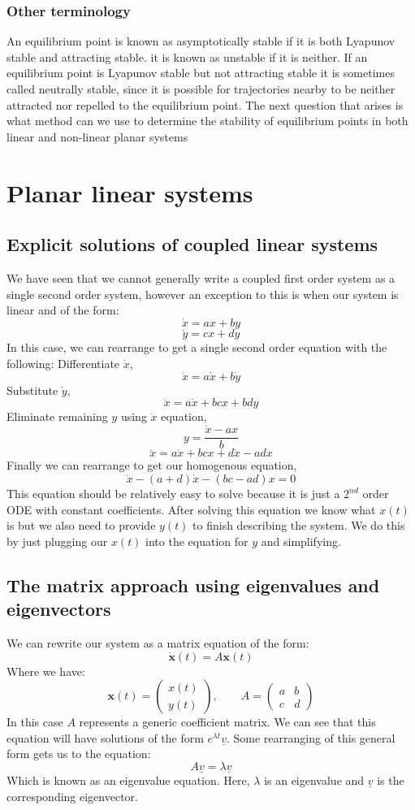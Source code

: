 \documentclass[12pt]{article}
\begin{document}
\subsubsection*{Other terminology}
An equilibrium point is known as asymptotically stable if it is both Lyapunov stable and attracting stable. it is known as unstable if it is neither. If an equilibrium point is Lyapunov stable but not attracting stable it is sometimes called neutrally stable, since it is possible for trajectories nearby to be neither attracted nor repelled to the equilibrium point. The next question that arises is what method can we use to determine the stability of equilibrium points in both linear and non-linear planar systems
\section{Planar linear systems}
\subsection*{Explicit solutions of coupled linear systems}
We have seen that we cannot generally write a coupled first order system as a single second order system, however an exception to this is when our system is linear and of the form:
\[\dot{x}=ax+by\]
\[\dot{y}=cx+dy\]
In this case, we can rearrange to get a single second order equation with the following: Differentiate \(\dot{x}\),
\[\ddot{x}=a\dot{x}+b\dot{y}\]
Substitute \(\dot{y}\),
\[\ddot{x}=a\dot{x}+bcx+bdy\]
Eliminate remaining \(y\) using \(\dot{x}\) equation,
\[y=\frac{\dot{x}-ax}{b}\]
\[\ddot{x}=a\dot{x}+bcx+d\dot{x}-adx\]
Finally we can rearrange to get our homogenous equation,
\[\ddot{x}-(a+d)\dot{x}-(bc-ad)x=0\]
This equation should be relatively easy to solve because it is just a \(2^{nd}\) order ODE with constant coefficients. After solving this equation we know what \(x(t)\) is but we also need to provide \(y(t)\) to finish describing the system. We do this by just plugging our \(x(t)\) into the equation for \(y\) and simplifying.
\subsection*{The matrix approach using eigenvalues and eigenvectors}
We can rewrite our system as a matrix equation of the form:
\[\dot{\textbf{x}}(t)=A\textbf{x}(t)\]
Where we have:
\[\textbf{x}(t)=\begin{pmatrix}
    x(t) \\
    y(t)
\end{pmatrix},\qquad A=\begin{pmatrix}
    a & b \\
    c & d
\end{pmatrix}\]
In this case \(A\) represents a generic coefficient matrix. We can see that this equation will have solutions of the form \(e^{\lambda t}\underline{v}\). Some rearranging of this general form gets us to the equation:
\[A\underline{v}=\lambda\underline{v}\]
Which is known as an eigenvalue equation. Here, \(\lambda\) is an eigenvalue and \(\underline{v}\) is the corresponding eigenvector.
\end{document}
